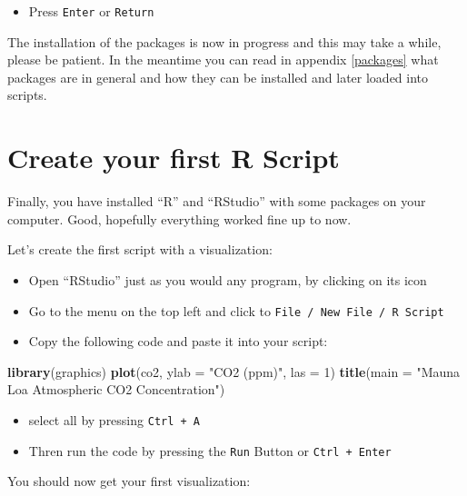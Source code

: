\documentclass[
]{book}
\newenvironment{Shaded}{\begin{snugshade}}{\end{snugshade}}
\newcommand{\DataTypeTok}[1]{\textcolor[rgb]{0.13,0.29,0.53}{#1}}
\newcommand{\DecValTok}[1]{\textcolor[rgb]{0.00,0.00,0.81}{#1}}
\newcommand{\KeywordTok}[1]{\textcolor[rgb]{0.13,0.29,0.53}{\textbf{#1}}}
\newcommand{\NormalTok}[1]{#1}
\newcommand{\StringTok}[1]{\textcolor[rgb]{0.31,0.60,0.02}{#1}}
\providecommand{\tightlist}{%
  \setlength{\itemsep}{0pt}\setlength{\parskip}{0pt}}
\let\oldShaded\Shaded
\let\endoldShaded\endShaded
\renewenvironment{Shaded}{\footnotesize\oldShaded}{\endoldShaded}
\begin{document}
\begin{itemize}
\tightlist
\item
  Press \texttt{Enter} or \texttt{Return}
\end{itemize}

The installation of the packages is now in progress and this may take a while, please be patient. In the meantime you can read in appendix \ref{packages} what packages are in general and how they can be installed and later loaded into scripts.

\hypertarget{createFirstScript}{%
\section{Create your first R Script}\label{createFirstScript}}

Finally, you have installed ``R'' and ``RStudio'' with some packages on your computer. Good, hopefully everything worked fine up to now.

Let's create the first script with a visualization:

\begin{itemize}
\item
  Open ``RStudio'' just as you would any program, by clicking on its icon
\item
  Go to the menu on the top left and click to \texttt{File\ /\ New\ File\ /\ R\ Script}
\item
  Copy the following code and paste it into your script:
\end{itemize}

\begin{Shaded}
\begin{Highlighting}[]
\KeywordTok{library}\NormalTok{(graphics)}
\KeywordTok{plot}\NormalTok{(co2, }\DataTypeTok{ylab =} \StringTok{"CO2 (ppm)"}\NormalTok{, }\DataTypeTok{las =} \DecValTok{1}\NormalTok{)}
\KeywordTok{title}\NormalTok{(}\DataTypeTok{main =} \StringTok{"Mauna Loa Atmospheric CO2 Concentration"}\NormalTok{)}
\end{Highlighting}
\end{Shaded}

\begin{itemize}
\item
  select all by pressing \texttt{Ctrl\ +\ A}
\item
  Thren run the code by pressing the \texttt{Run} Button or \texttt{Ctrl\ +\ Enter}
\end{itemize}

You should now get your first visualization:
\end{document}
